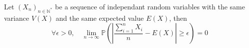 \documentclass[]{article}
\begin{document}
\begin{theorem}
  Let $\left(X_n \right)_{n\in\mathbb{N}^*}$ be a sequence of independant
  random variables with the same variance $V(X)$ and the same expected
  value $E(X)$, then
  \begin{equation}
    \forall \epsilon > 0,\quad \lim_{n\rightarrow\infty} \mathbb{P} \left(\left|\frac{\sum_{i=1}^{n}X_i
}{n} - E(X)\right| \geq \epsilon  \right) = 0
  \end{equation}
\end{theorem}

\begin{remark}
  \lipsum[1]
\end{remark}
\begin{definition}
  \lipsum[1]
\end{definition}
\begin{example}
  \lipsum[1]
\end{example}
\begin{example}
  \lipsum \lipsum
\end{example}
\end{document}
